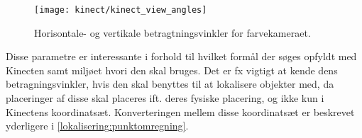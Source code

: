 \begin{figure}
\centering
\texttt{[image: kinect/kinect\_view\_angles]}
\caption{Horisontale- og vertikale betragtningsvinkler for farvekameraet.}
\label{kinect:vinkler}
\end{figure}

Disse parametre er interessante i forhold til hvilket formål der søges opfyldt med Kinecten samt miljøet hvori den skal bruges. 
Det er fx vigtigt at kende dens betragningsvinkler, hvis den skal benyttes til at lokalisere objekter med, da placeringer af disse skal placeres ift. deres fysiske placering, og ikke kun i Kinectens koordinatsæt.
Konverteringen mellem disse koordinatsæt er beskrevet yderligere i \cref{lokalisering:punktomregning}.

%
%
